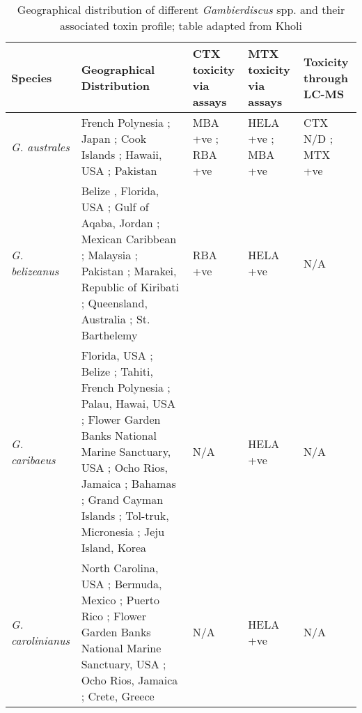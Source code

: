 \documentclass[12pt]{article}
\begin{document}
	
	\begin{longtable}{ | p{2cm} | p{5.5cm} | p{2.3cm} | p{2.3cm} | p{2.3cm} | }
	\caption{Geographical distribution of different \emph{Gambierdiscus} spp. and their associated toxin profile; table adapted from Kholi \cite{kohli2013Gambierdiscus}} \\
	\label{tbl:GeoTable}
	\textbf{Species} & \textbf{Geographical Distribution} & \textbf{CTX toxicity via assays} & \textbf{MTX toxicity via assays} & \textbf{Toxicity through LC-MS} \\
	\hline
	\emph{G. australes} & French Polynesia \cite{chinain1999morphology}; Japan \cite{nishimura2013genetic}; Cook Islands \cite{rhodes2010toxic}; Hawaii, USA \cite{litaker2009taxonomy}; Pakistan \cite{munir2011occurrence} & MBA +ve \cite{rhodes2010toxic}; RBA +ve \cite{chinain2010growth} & HELA +ve \cite{holland2013differences}; MBA +ve \cite{rhodes2010toxic} & CTX N/D \cite{}; MTX +ve \cite{}\\
	\hline
	\emph{G. belizeanus} & Belize \cite{faust1995observation}, Florida, USA \cite{litaker2009taxonomy}; Gulf of Aqaba, Jordan \cite{saburova2013new}; Mexican Caribbean \cite{hernandez2004species}; Malaysia \cite{leaw2011first}; Pakistan \cite{munir2011occurrence}; Marakei, Republic of Kiribati \cite{xu2014distribution}; Queensland, Australia \cite{murray2014molecular}; St. Barthelemy \cite{litaker2010global} & RBA +ve \cite{chinain2010growth} & HELA +ve \cite{holland2013differences} & N/A \\ 
	\hline
	\emph{G. caribaeus} & Florida, USA \cite{litaker2009taxonomy}; Belize \cite{litaker2009taxonomy}; Tahiti, French Polynesia \cite{litaker2009taxonomy}; Palau, Hawai, USA \cite{litaker2009taxonomy}; Flower Garden Banks National Marine Sanctuary, USA \cite{holland2013differences}; Ocho Rios, Jamaica \cite{holland2013differences}; Bahamas \cite{litaker2010global}; Grand Cayman Islands \cite{}; Tol-truk, Micronesia \cite{litaker2010global}; Jeju Island, Korea \cite{jeong2012first} & N/A & HELA +ve \cite{holland2013differences} & N/A \\
	\hline
	\emph{G. carolinianus} & North Carolina, USA \cite{litaker2009taxonomy}; Bermuda, Mexico \cite{litaker2010global}; Puerto Rico \cite{holland2013differences}; Flower Garden Banks National Marine Sanctuary, USA \cite{holland2013differences}; Ocho Rios, Jamaica \cite{holland2013differences}; Crete, Greece \cite{holland2013differences} & N/A & HELA +ve \cite{holland2013differences} & N/A\\

\end{longtable}
\end{document}

